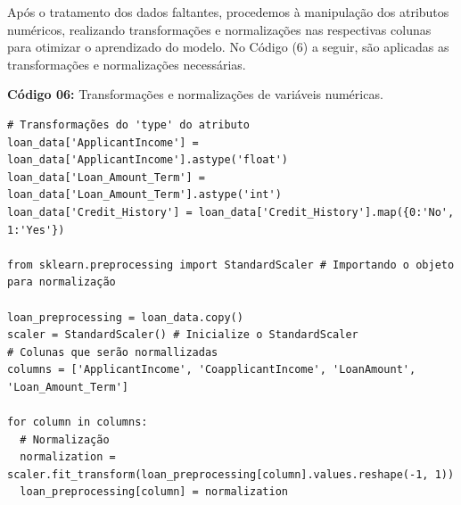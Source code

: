 \documentclass[a4paper,12pt]{article} %
\begin{document}
Após o tratamento dos dados faltantes, procedemos à manipulação dos atributos numéricos, realizando transformações e normalizações nas respectivas colunas para otimizar o aprendizado do modelo. No Código (6) a seguir, são aplicadas as transformações e normalizações necessárias.
\begin{center}
\textbf{Código 06:} Transformações e normalizações de variáveis numéricas.
\begin{verbatim}
# Transformações do 'type' do atributo
loan_data['ApplicantIncome'] = loan_data['ApplicantIncome'].astype('float')
loan_data['Loan_Amount_Term'] = loan_data['Loan_Amount_Term'].astype('int')
loan_data['Credit_History'] = loan_data['Credit_History'].map({0:'No', 1:'Yes'})

from sklearn.preprocessing import StandardScaler # Importando o objeto para normalização

loan_preprocessing = loan_data.copy()
scaler = StandardScaler() # Inicialize o StandardScaler
# Colunas que serão normallizadas
columns = ['ApplicantIncome', 'CoapplicantIncome', 'LoanAmount', 'Loan_Amount_Term']

for column in columns:
  # Normalização
  normalization = scaler.fit_transform(loan_preprocessing[column].values.reshape(-1, 1))
  loan_preprocessing[column] = normalization
\end{verbatim}
\end{center}
\end{document}
